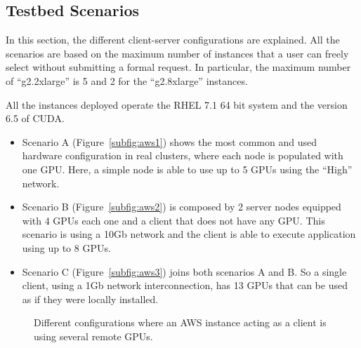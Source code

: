 \documentclass[a4paper,twoside]{article}
\begin{document}
\subsection{Testbed Scenarios}
In this section, the different client-server configurations 
are explained. All the scenarios are based on the maximum number of instances 
that a user can freely select without submitting a formal request. 
In particular, the maximum number of ``g2.2xlarge'' is 5 and 2 for the ``g2.8xlarge'' instances.

All the instances deployed operate the RHEL 7.1 64 bit system and the version 6.5 of CUDA. 

\begin{itemize}
\item Scenario A (Figure~\ref{subfig:aws1}) shows the most common 
and used hardware configuration in real clusters, where each node is 
populated with one GPU. Here, a simple node is able to use up to 5 GPUs 
using the ``High'' network. 

\item Scenario B (Figure~\ref{subfig:aws2}) is composed by 2 server nodes equipped 
with 4 GPUs each one and a client that does not have any GPU. This scenario is using 
a 10Gb network and the client is able to execute application using up to 8 GPUs.

\item Scenario C (Figure~\ref{subfig:aws3}) joins both scenarios A and B. So a 
single client, using a 1Gb network interconnection, has 13 GPUs that can be used as if they were locally installed.
\end{itemize}

\begin{figure}[ht]
\centering
{}
\quad
{}
\caption{Different configurations where an AWS instance acting as a client is using several remote GPUs.}
\label{fig:aws}
\end{figure}
\end{document}
